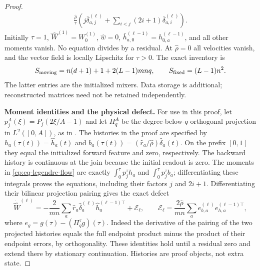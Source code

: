\begin{proof}
\begin{align}
 \frac{\widehat\rho}{\tau}
 \left(j\bar\delta_{a,j}^{(\ell)}+
       \sum_{i<j}(2i+1)\bar\delta_{a,i}^{(\ell)}\right).
 \label{cp:eq-legendre-flow}
\end{align}
Initially $\tau=1$, $\widehat W^{(1)}=W_0^{(1)}$, $\widehat w=0$,
$\bar h_{a,0}^{(\ell-1)}=h_{0,a}^{(\ell-1)}$, and all other moments
vanish.  No equation divides by a residual.  At $\widehat\rho=0$ all
velocities vanish, and the vector field is locally Lipschitz for
$\tau>0$.  The exact inventory is
\begin{equation}
 S_{\rm moving}=n(d+1)+1+2(L-1)mnq,\qquad
 S_{\rm fixed}=(L-1)n^2.
 \label{cp:eq-legendre-count}
\end{equation}
The latter entries are the initialized mixers.  Data storage is
additional; reconstructed matrices need not be retained independently.

\noindent\textbf{Moment identities and the physical defect.}\quad
For use in this proof, let $p_j^A(\xi)=P_j(2\xi/A-1)$ and let
$\Pi_q^A$ be the degree-below-$q$ orthogonal projection in $L^2([0,A])$,
as in .
The histories in the proof are specified by
$h_a(\tau(t))=\widehat h_a(t)$ and
$b_a(\tau(t))=(\widehat r_a/\widehat\rho)\widehat\delta_a(t)$.
On the prefix $[0,1]$ they equal the initialized forward feature and
zero, respectively.  The backward history is continuous at the join
because the initial readout is zero.  The moments in
\eqref{cp:eq-legendre-flow} are exactly $\int_0^\tau p_j^\tau h_a$
and $\int_0^\tau p_j^\tau b_a$; differentiating these integrals proves
the equations, including their factors $j$ and $2i+1$.
Differentiating their bilinear projection pairing gives the exact defect
\begin{equation}
 \dot{\widehat W}^{(\ell)}
 =-\frac2{mn}\sum_a\widehat r_a\widehat\delta_a^{(\ell)}
                       \widehat h_a^{(\ell-1)\top}+\mathcal E_\ell,
 \qquad
 \mathcal E_\ell=\frac{2\widehat\rho}{mn}
       \sum_a e_{b,a}^{(\ell)}e_{h,a}^{(\ell-1)\top},
 \label{cp:eq-legendre-defect}
\end{equation}
where $e_g=g(\tau)-(\Pi_q^\tau g)(\tau)$.
Indeed the derivative of the pairing of the two projected histories
equals the full endpoint product minus the product of their endpoint
errors, by orthogonality.  These identities hold until a residual zero
and extend there by stationary continuation.  Histories are proof
objects, not extra state.


\end{proof}
